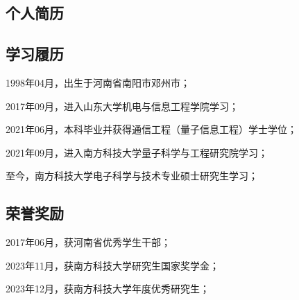 
\begin{resume}

  \section{个人简历} %
  \subsection{学习履历}

  1998年04月，出生于河南省南阳市邓州市；

  2017年09月，进入山东大学机电与信息工程学院学习；
  
  2021年06月，本科毕业并获得通信工程（量子信息工程）学士学位；

  2021年09月，进入南方科技大学量子科学与工程研究院学习；
  
  至今，南方科技大学电子科学与技术专业硕士研究生学习；

  \subsection{荣誉奖励}



  2017年06月，获河南省优秀学生干部；

  2023年11月，获南方科技大学研究生国家奖学金；

  2023年12月，获南方科技大学年度优秀研究生；
  






\end{resume}

